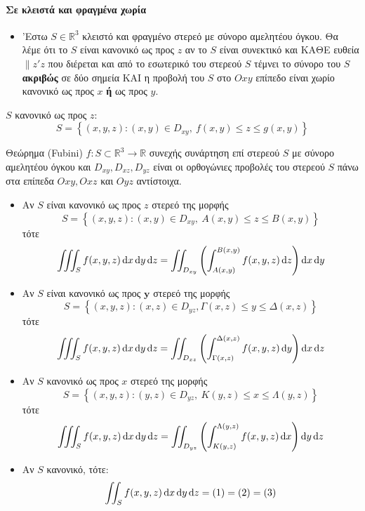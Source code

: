 \documentclass[11pt,a4paper,titlepage,draft]{article}
\begin{document}
\paragraph{ Σε κλειστά και φραγμένα χωρία}
\begin{itemize}
\item 'Εστω \(S \in  \mathbb R ^3\) κλειστό και φραγμένο στερεό με σύνορο αμελητέου όγκου. Θα λέμε ότι το \(S\) είναι κανονικό ως προς \(z\) αν το \(S\) είναι συνεκτικό και ΚΑΘΕ ευθεία \(\parallel z'z\) που διέρεται και από το εσωτερικό του στερεού \(S\) τέμνει το σύνορο του \(S\) \textbf{ακριβώς} σε δύο σημεία ΚΑΙ η προβολή του \(S\) στο \(Oxy\) επίπεδο είναι χωρίο κανονικό ως προς \(x\) \textbf{ή} ως προς \(y\).
\end{itemize}



\(S\) κανονικό ως προς \(z\):
\[
S =  \left\lbrace (x,y,z): (x,y) \in D_{xy},\ f(x,y)\leq z \leq g(x,y)  \right\rbrace
\]

\begin{attnbox}{Θεώρημα (\textlatin{Fubini})}
\setcounter{equation}{0}
\(f: S \subset  \mathbb R ^3 \to  \mathbb R \) συνεχής συνάρτηση επί στερεού \(S\) με σύνορο αμελητέου όγκου και \(D_{xy},D_{xz},D_{yz}\) είναι οι ορθογώνιες προβολές του στερεού \(S\) πάνω στα επίπεδα \(Oxy,Oxz\) και \(Oyz\) αντίστοιχα.
\begin{itemize}
\item Αν \(S\) είναι κανονικό ως προς \(z\) στερεό της μορφής
\[
S =  \left\lbrace (x,y,z): (x,y) \in D_{xy},\ A(x,y) \leq z \leq B(x,y) \right\rbrace
\]
τότε
\begin{equation}
\iiint_S f(x,y,z) \dif x \dif y\dif z = \iint_{D_{xy}} \left(
\int_{A(x,y)}^{B(x,y)} f(x,y,z)\dif z
\right) \dif x \dif y
\end{equation}
\item Αν \(S\) είναι κανονικό ως προς \(\mathbf{y}\) στερεό της μορφής
\[
S =  \left\lbrace (x,y,z): (x,z) \in D_{yz}, \Gamma (x,z) \leq y \leq \Delta (x,z)
 \right\rbrace
\]
τότε
\begin{equation}
\iiint_S f(x,y,z)\dif x \dif y \dif z =
\iint_{D_{xz}} \left(
\int_{\Gamma(x,z)}^{\Delta(x,z)} f(x,y,z) \dif y
\right) \dif x \dif z
\end{equation}
\item Αν \(S\) κανονικό ως προς \(x\) στερεό της μορφής
\[
S =  \left\lbrace (x,y,z): (y,z) \in D_{yz},\ K(y,z)\leq x \leq \Lambda (y,z) \right\rbrace
\]
τότε
\begin{equation}
\iiint_S f(x,y,z)\dif x \dif y \dif z = 
\iint_{D_{yz}} \left(
\int_{K(y,z)}^{\Lambda(y,z)}f(x,y,z) \dif x
\right) \dif y \dif z
\end{equation}
\item Αν \(S\) κανονικό, τότε:
\[
\iint_S f(x,y,z)\dif x \dif y \dif z = (1) = (2) = (3)
\]
\end{itemize}
\end{attnbox}
\end{document}
